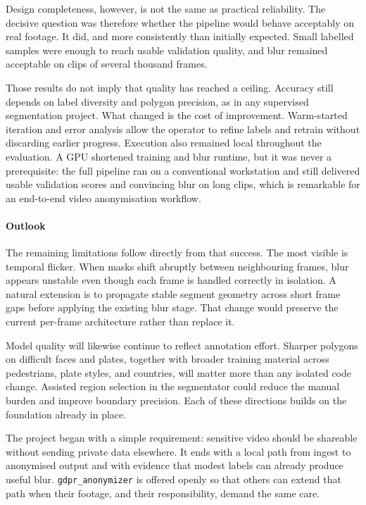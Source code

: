Design completeness, however, is not the same as practical reliability. The decisive question was therefore whether the pipeline would behave acceptably on real footage. It did, and more consistently than initially expected. Small labelled samples were enough to reach usable validation quality, and blur remained acceptable on clips of several thousand frames.

Those results do not imply that quality has reached a ceiling. Accuracy still depends on label diversity and polygon precision, as in any supervised segmentation project. What changed is the cost of improvement. Warm-started iteration and error analysis allow the operator to refine labels and retrain without discarding earlier progress. Execution also remained local throughout the evaluation. A GPU shortened training and blur runtime, but it was never a prerequisite: the full pipeline ran on a conventional workstation and still delivered usable validation scores and convincing blur on long clips, which is remarkable for an end-to-end video anonymisation workflow.

\paragraph{Outlook}

The remaining limitations follow directly from that success. The most visible is temporal flicker. When masks shift abruptly between neighbouring frames, blur appears unstable even though each frame is handled correctly in isolation. A natural extension is to propagate stable segment geometry across short frame gaps before applying the existing blur stage. That change would preserve the current per-frame architecture rather than replace it.

Model quality will likewise continue to reflect annotation effort. Sharper polygons on difficult faces and plates, together with broader training material across pedestrians, plate styles, and countries, will matter more than any isolated code change. Assisted region selection in the segmentator could reduce the manual burden and improve boundary precision. Each of these directions builds on the foundation already in place.

The project began with a simple requirement: sensitive video should be shareable without sending private data elsewhere. It ends with a local path from ingest to anonymised output and with evidence that modest labels can already produce useful blur. \texttt{gdpr\_anonymizer} is offered openly so that others can extend that path when their footage, and their responsibility, demand the same care.
